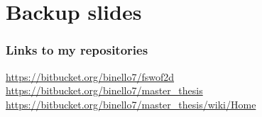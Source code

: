 \documentclass[xcolor=dvipsnames, USenglish]{beamer}  %
\begin{document}
\section{Backup slides}
  \begin{frame}
    \frametitle{Links to my repositories}
    \small{\url{https://bitbucket.org/binello7/fswof2d}}\\
    \small{\url{https://bitbucket.org/binello7/master_thesis}}\\
    \small{\url{https://bitbucket.org/binello7/master_thesis/wiki/Home}}
  \end{frame}

\end{document}
